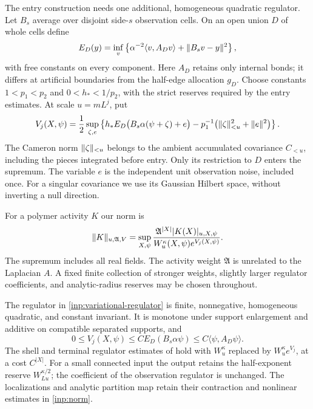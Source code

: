 The entry construction needs one additional, homogeneous quadratic
regulator.  Let \(B_s\) average over disjoint side-\(s\) observation
cells.  On an open union \(D\) of whole cells define
\begin{equation}\label{inp:observation-energy}
 E_D(y)=\inf_v\left\{\alpha^{-2}\langle v,A_Dv\rangle
                                     +\lVert B_sv-y\rVert^2\right\},
\end{equation}
with free constants on every component.  Here \(A_D\) retains only
internal bonds; it differs at artificial boundaries from the
half-edge allocation \(g_D\).  Choose constants
\(1<p_1<p_2\) and \(0<h_*<1/p_2\), with the strict reserves required
by the entry estimates.  At scale \(u=mL^j\), put
\begin{equation}\label{inp:variational-regulator}
 V_j(X,\psi)=\frac12\sup_{\zeta,e}
 \left\{h_*E_D\bigl(B_s\alpha(\psi+\zeta)+e\bigr)
       -p_1^{-1}\bigl(\lVert\zeta\rVert_{<u}^2+\lVert e\rVert^2\bigr)\right\}.
\end{equation}
The Cameron norm \(\lVert\zeta\rVert_{<u}\) belongs to the ambient
accumulated covariance \(C_{<u}\), including the pieces integrated
before entry.  Only its restriction to \(D\) enters the supremum.
The variable \(e\) is the independent unit observation noise,
included once.  For a singular covariance we use its Gaussian
Hilbert space, without inverting a null direction.

For a polymer activity \(K\) our norm is
\begin{equation}\label{inp:norm}
 \lVert K\rVert_{u,\mathfrak A,V}=
 \sup_{X,\psi}
 \frac{\mathfrak A^{|X|}|K(X)|_{u,X,\psi}}
      {W_u^\kappa(X,\psi)e^{V_j(X,\psi)}}.
\end{equation}
The supremum includes all real fields.  The activity weight
\(\mathfrak A\) is unrelated to the Laplacian \(A\).  A fixed
finite collection of stronger weights, slightly larger regulator
coefficients, and analytic-radius reserves may be chosen throughout.

\begin{proposition}\label{inp:regulator}
The regulator in \eqref{inp:variational-regulator} is finite,
nonnegative, homogeneous quadratic, and constant invariant.  It is
monotone under support enlargement and additive on compatible
separated supports, and
\[
 0\le V_j(X,\psi)\le CE_D(B_s\alpha\psi)
                            \le C\langle\psi,A_D\psi\rangle.
\]
The shell and terminal regulator estimates of
\cite[Lemmas 4.4 and 9.2]{B} hold with
\(W_u^\kappa\) replaced by \(W_u^\kappa e^{V_j}\), at a cost
\(C^{|X|}\).  For a small connected input the output retains the
half-exponent reserve \(W_{Lu}^{\kappa/2}\); the coefficient of the
observation regulator is unchanged.  The localizations and analytic
partition map retain their contraction and nonlinear estimates in
\eqref{inp:norm}.
\end{proposition}

